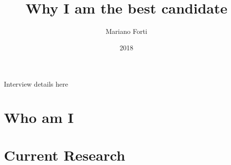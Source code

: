 \documentclass{beamer}
\title{Why I am the best candidate}
\author{Mariano Forti}
\date{2018}
\begin{document}
\begin{frame}
\titlepage
\begin{block}
  Interview details here
\end{block}

\end{frame}


\section{Who am I}


\section{Current Research}



\end{document}

